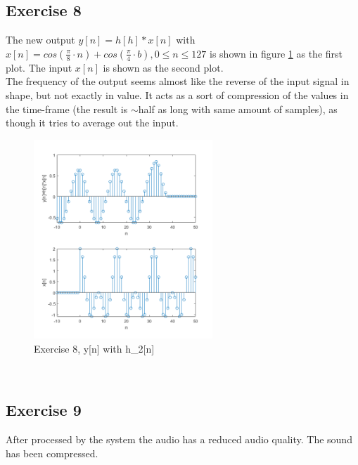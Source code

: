 \documentclass[a4paper]{article}
\begin{document}
\subsection{Exercise 8}
The new output $y[n] = h[h]*x[n]$ with $x[n] = cos(\frac{\pi}{8} \cdot n)+cos(\frac{\pi}{4} \cdot b) , 0 \leq n \leq 127$ is shown in figure \ref{fig:7} as the first plot. The input $x[n]$ is shown as the second plot.
\\
The frequency of the output seems almost like the reverse of the input signal in shape, but not exactly in value. It acts as a sort of compression of the values in the time-frame (the result is $\sim$half as long with same amount of samples), as though it tries to average out the input.
\begin{figure}
    \centering
    \includegraphics[width=0.6\textwidth]{7.png}
    \caption{Exercise 8, y[n] with h_2[n]}
    \label{fig:7}
\end{figure}
\\
\subsection{Exercise 9}
After processed by the system the audio has a reduced audio quality. The sound has been compressed.
\end{document}

